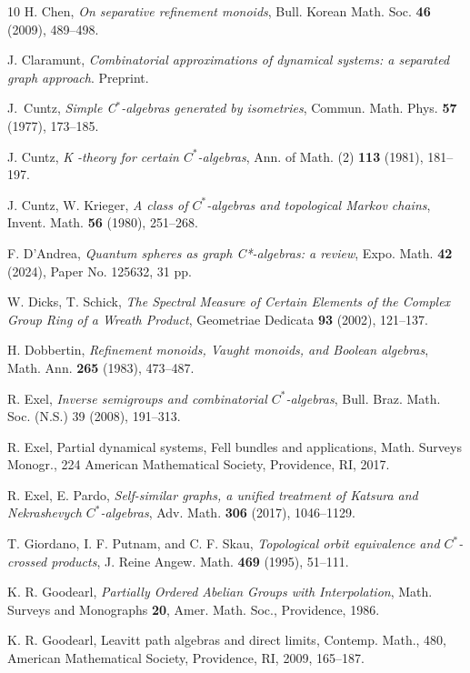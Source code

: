 \documentclass[11pt]{amsart}
\theoremstyle{plain}            %
\theoremstyle{definition}       %
\theoremstyle{definition}       %
\theoremstyle{remark}
\begin{document}
\begin{thebibliography}{10}
    H. Chen, \emph{On separative refinement monoids}, 
    Bull. Korean Math. Soc. \textbf{46} (2009), 489--498.

    J. Claramunt, \emph{Combinatorial approximations of dynamical systems: a separated graph approach}. Preprint. 

	J.~Cuntz, {\em Simple {\rm C}$^*$-algebras generated by isometries}, Commun.
	Math. Phys. \textbf{57} (1977), 173--185.
	
	 J. Cuntz, \emph{K -theory for certain  $C^*$-algebras},
	Ann. of Math. (2) \textbf{113} (1981), 181--197.

     J. Cuntz, W. Krieger, \emph{A class of  $C^*$-algebras and topological Markov chains},
Invent. Math. \textbf{56} (1980), 251--268.

	 F. D'Andrea, \emph{Quantum spheres as graph C*-algebras: a review},
	Expo. Math. \textbf{42} (2024), Paper No. 125632, 31 pp.
	
	 W. Dicks, T. Schick, \emph{The Spectral Measure of Certain Elements of the Complex Group Ring of a Wreath Product}, Geometriae Dedicata {\bf 93} (2002), 121--137.

    H. Dobbertin, \emph{Refinement monoids, Vaught monoids, and Boolean algebras},
   Math. Ann. {\bf 265} (1983), 473--487.
	
	 R. Exel, \emph{Inverse semigroups and combinatorial  $C^*$-algebras},
	Bull. Braz. Math. Soc. (N.S.) 39 (2008), 191--313.
	
	 R. Exel, Partial dynamical systems, Fell bundles and applications,
	Math. Surveys Monogr., 224
	American Mathematical Society, Providence, RI, 2017. 
	
	 R. Exel, E. Pardo, \emph{Self-similar graphs, a unified treatment of Katsura and Nekrashevych  $C^*$-algebras}, Adv. Math. \textbf{306} (2017), 1046--1129.

    T. Giordano, I. F. Putnam, and C. F. Skau, \emph{Topological orbit equivalence and $C^*$-crossed
 products}, J. Reine Angew. Math. \textbf{469} (1995), 51--111.
    
	 K. R. Goodearl, \emph{Partially Ordered Abelian Groups with Interpolation}, Math. Surveys and Monographs \textbf{20}, Amer. Math. Soc., Providence, 1986.
	
	 K. R. Goodearl, Leavitt path algebras and direct limits,
	Contemp. Math., 480, American Mathematical Society, Providence, RI, 2009, 165--187.
	

\end{thebibliography}
\end{document}
